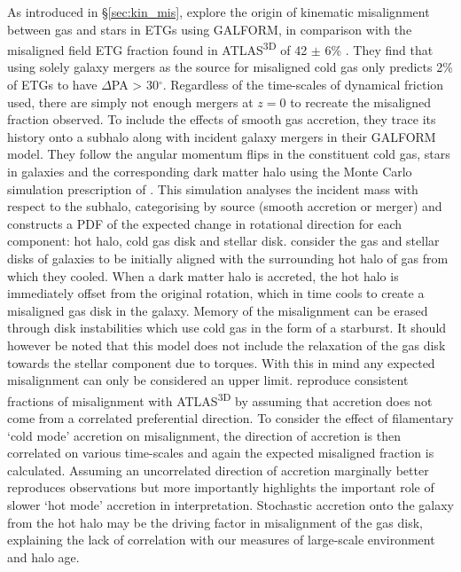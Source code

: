 As introduced in \S \ref{sec:kin_mis}, \citet{lagos2015} explore the origin of kinematic misalignment between gas and stars in ETGs using GALFORM, in comparison with the misaligned field ETG fraction found in ATLAS\textsuperscript{3D} of 42 $\pm$ 6\%  \citep{davis2011}. They find that using solely galaxy mergers as the source for misaligned cold gas only predicts 2\% of ETGs to have $\Delta$PA > 30$^{\circ}$. Regardless of the time-scales of dynamical friction used, there are simply not enough mergers at $z=0$ to recreate the misaligned fraction observed. To include the effects of smooth gas accretion, they trace its history onto a subhalo along with incident galaxy mergers in their GALFORM model. They follow the angular momentum flips in the constituent cold gas, stars in galaxies and the corresponding dark matter halo using the Monte Carlo simulation prescription of \citet{padilla2014}. This simulation analyses the incident mass with respect to the subhalo, categorising by source (smooth accretion or merger) and constructs a PDF of the expected change in rotational direction for each component: hot halo, cold gas disk and stellar disk. \citet{padilla2014,lagos2015} consider the gas and stellar disks of galaxies to be initially aligned with the surrounding hot halo of gas from which they cooled. When a dark matter halo is accreted, the hot halo is immediately offset from the original rotation, which in time cools to create a misaligned gas disk in the galaxy. Memory of the misalignment can be erased through disk instabilities which use cold gas in the form of a starburst. It should however be noted that this model does not include the relaxation of the gas disk towards the stellar component due to torques. With this in mind any expected misalignment can only be considered an upper limit. \citet{lagos2015} reproduce consistent fractions of misalignment with ATLAS\textsuperscript{3D} by assuming that accretion does not come from a correlated preferential direction. To consider the effect of filamentary `cold mode' accretion on misalignment, the direction of accretion is then correlated on various time-scales and again the expected misaligned fraction is calculated. Assuming an uncorrelated direction of accretion marginally better reproduces observations but more importantly highlights the important role of slower `hot mode' accretion in interpretation. Stochastic accretion onto the galaxy from the hot halo may be the driving factor in misalignment of the gas disk, explaining the lack of correlation with our measures of large-scale environment and halo age. 


